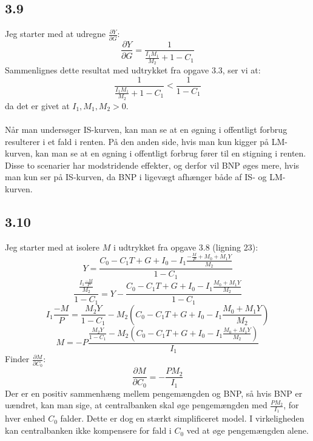 \documentclass{article}
\begin{document}
\subsection*{3.9}
Jeg starter med at udregne $\frac{\partial Y}{\partial G}$:
\begin{equation}
    \frac{\partial Y}{\partial G}=\frac{1}{\frac{I_1 M_1}{M_2}+1-C_1}
\end{equation}
Sammenlignes dette resultat med udtrykket fra opgave 3.3, ser vi at:
\begin{equation}
    \frac{1}{\frac{I_1 M_1}{M_2}+1-C_1}<\frac{1}{1-C_1}
\end{equation}
da det er givet at $I_1, M_1, M_2>0$.
\\
\\
Når man undersøger IS-kurven, kan man se at en øgning i offentligt forbrug resulterer i et fald i renten. På den anden side, hvis man kun kigger på LM-kurven, kan man se at en øgning i offentligt forbrug fører til en stigning i renten. Disse to scenarier har modstridende effekter, og derfor vil BNP øges mere, hvis man kun ser på IS-kurven, da BNP i ligevægt afhænger både af IS- og LM-kurven.

\subsection*{3.10}
Jeg starter med at isolere $M$ i udtrykket fra opgave 3.8 (ligning 23):
\begin{equation}
    Y=\frac{C_0-C_1 T+G+I_0-I_1 \frac{-\frac{M}{P}+M_0+M_1 Y}{M_2}}{1-C_1}
\end{equation}
\begin{equation}
    \frac{\frac{I_1 \frac{-M}{P}}{M_2}}{1-C_1}=Y-\frac{C_0-C_1 T+G+I_0-I_1 \frac{M_0+M_1 Y}{M_2}}{1-C_1}
\end{equation}
\begin{equation}
    I_1 \frac{-M}{P}=\frac{M_2 Y}{1-C_1}-M_2\left(C_0-C_1 T+G+I_0-I_1 \frac{M_0+M_1 Y}{M_2}\right)
\end{equation}
\begin{equation}
    M=-P \frac{\frac{M_2 Y}{1-C_1}-M_2\left(C_0-C_1 T+G+I_0-I_1 \frac{M_0+M_1 Y}{M_2}\right)}{I_1}
\end{equation}
Finder $\frac{\partial M}{\partial C_0}$:
\begin{equation}
    \frac{\partial M}{\partial C_0}=-\frac{P M_2}{I_1}
\end{equation}
Der er en positiv sammenhæng mellem pengemængden og BNP, så hvis BNP er uændret, kan man sige, at centralbanken skal øge pengemængden med $\frac{P M_2}{I_1}$, for hver enhed $C_0$ falder. Dette er dog en stærkt simplificeret model. I virkeligheden kan centralbanken ikke kompensere for fald i $C_0$ ved at øge pengemængden alene.
\end{document}
